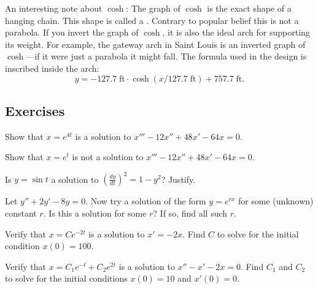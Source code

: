 An interesting note about $\cosh$:  The graph of $\cosh$ is the exact shape
of a hanging chain.  This shape is called
a \emph{}.
Contrary to popular belief this is not a
parabola.  If you invert the graph of $\cosh$, it is also the ideal arch for
supporting its weight.
For example, the gateway arch in Saint Louis is an inverted graph of
$\cosh$---if it were just a parabola it might fall.  The formula
used in the design is
inscribed inside the arch:
\begin{equation*}
y = -127.7 \; \textrm{ft} \cdot \cosh({x / 127.7  \; \textrm{ft}}) + 757.7 \;
\textrm{ft} .
\end{equation*}

\subsection{Exercises}


\begin{exercise}
	Show that $x = e^{4t}$ is a solution to $x'''-12 x'' + 48 x' - 64 x = 0$.
\end{exercise}

\begin{exercise}
	Show that $x = e^{t}$ is not a solution to $x'''-12 x'' + 48 x' - 64 x = 0$.
\end{exercise}

\begin{exercise}
	Is $y = \sin t$ a solution to ${\left( \frac{dy}{dt} \right)}^2 = 1 - y^2$?
	Justify.
\end{exercise}

\begin{exercise}
	Let $y'' + 2y' - 8y = 0$.  Now try a solution of the form $y = e^{rx}$ for
	some (unknown) constant $r$.  Is this a solution
	for some $r$?  If so, find all such $r$.
\end{exercise}


\begin{exercise}
	Verify that $x = C e^{-2t}$ is a solution to $x' = -2x$.
	Find $C$ to solve for the initial condition $x(0) = 100$.
\end{exercise}

\begin{exercise}
	Verify that $x = C_1 e^{-t} + C_2 e^{2t}$ is a solution to $x'' - x' -2 x =
	0$.  Find $C_1$ and $C_2$ to solve for the initial conditions $x(0) = 10$
	and $x'(0) = 0$.
\end{exercise}

